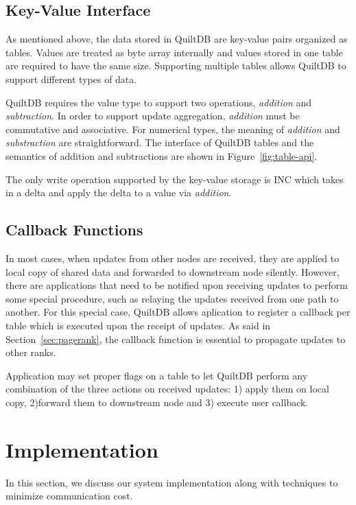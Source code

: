\documentclass{acm_proc_article-sp}
\begin{document}
\subsection{Key-Value Interface}

As mentioned above, the data stored in QuiltDB are key-value pairs organized 
as tables. Values are treated as byte array internally and values stored in one 
table are required to have the same size. Supporting multiple tables allows 
QuiltDB to support different types of data.

QuiltDB requires the value type to support two operations, \emph{addition} and 
\emph{subtraction}. In order to support update aggregation, \emph{addition} must
 be commutative and associative. For numerical types,  the meaning of 
\emph{addition} and \emph{substraction} are straightforward. The interface of 
QuiltDB tables and the semantics of addition and subtractions are shown in
Figure~\ref{fig:table-api}.

The only write operation supported by the key-value storage is INC which takes 
in a delta and apply the delta to a value via \emph{addition}.

\subsection{Callback Functions}
\label{sec:callback}

In most cases, when updates from other nodes are received, they are applied to 
local copy of shared data and forwarded to downstream node silently. 
However, there are applications that need to be notified upon receiving updates 
to perform some special procedure, such as relaying the updates received from 
one path to another. For this special case, QuiltDB allows aplication to 
register a callback per table which is executed upon the receipt of updates. As 
said in Section~\ref{sec:pagerank}, the callback function is essential to 
propagate updates to other ranks.

Application may set proper flags on a table to let QuiltDB perform any 
combination of the three actions on received updates: 1) apply them on local 
copy, 2)forward them to downstream node and 3) execute user callback.

\section{Implementation}
In this section, we discuss our system implementation along with techniques to 
minimize communication cost.
\end{document}
